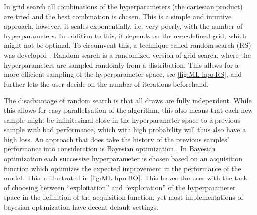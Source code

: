 In grid search all combinations of the hyperparameters (the cartesian product) are tried and the best combination is chosen. This is a simple and intuitive approach, however, it scales exponentially, i.e. very poorly, with the number of hyperparameters. In addition to this, it depends on the user-defined grid, which might not be optimal. To circumvent this, a technique called random search (RS) was developed \autocite{bergstraRandomSearchHyperparameter2012a}. Random search is a randomized version of grid search, where the hyperparameters are sampled randomly from a distribution. This allows for a more efficient sampling of the hyperparameter space, see \autoref{fig:ML-hpo-RS}, and further lets the user decide on the number of iterations beforehand.


The disadvantage of random search is that all draws are fully independent. While this allows for easy parallelisation of the algorithm, this also means that each new sample might be infinitesimal close in the hyperparameter space to a previous sample with bad performance, which with high probability will thus also have a high loss. An approach that does take the history of the previous samples' performance into consideration is Bayesian optimization \autocite{brochuTutorialBayesianOptimization2010a}. In Bayesian optimization each successive hyperparameter is chosen based on an acquisition function which optimizes the expected improvement in the performance of the model. This is illustrated in \autoref{fig:ML-hpo-BO}. This leaves the user with the task of choosing between ``exploitation'' and ``exploration'' of the hyperparameter space in the definition of the acquisition function, yet most implementations of bayesian optimization have decent default settings.

